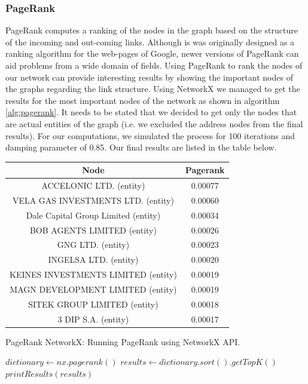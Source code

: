 \documentclass[sigconf, nonacm]{acmart}
\begin{document}
\subsubsection{PageRank}
PageRank computes a ranking of the nodes in the graph based on the structure of the incoming and out-coming links. Although is was originally designed as a ranking algorithm for the web-pages of Google, newer versions of PageRank can aid problems from a wide domain of fields. Using PageRank to rank the nodes of our network can provide interesting results by showing the important nodes of the graphs regarding the link structure. Using NetworkX we managed to get the results for the most important nodes of the network as shown in algorithm \ref{alg:pagerank}. It needs to be stated that we decided to get only the nodes that are actual entities of the graph (i.e. we excluded the address nodes from the final results). For our computations, we simulated the process for 100 iterations and damping parameter of 0.85. Our final results are listed in the table below.
\begin{center}
\begin{tabular}{||c | c ||} %
 \hline
 Node & Pagerank \\ [0.5ex] 
 \hline\hline
 ACCELONIC LTD. (entity) & 0.00077 \\ 
 \hline
VELA GAS INVESTMENTS LTD. (entity) & 0.00060 \\
 \hline
Dale Capital Group Limited (entity) & 0.00034 \\
 \hline
BOB AGENTS LIMITED (entity) & 0.00026 \\
 \hline
GNG LTD. (entity) & 0.00023 \\
 \hline
INGELSA LTD. (entity) & 0.00020 \\
 \hline
KEINES INVESTMENTS LIMITED (entity) & 0.00019 \\
 \hline
MAGN DEVELOPMENT LIMITED (entity) & 0.00019 \\
 \hline
SITEK GROUP LIMITED (entity) & 0.00018 \\
 \hline
3 DIP S.A. (entity) & 0.00017 \\
 \hline
\end{tabular}
\end{center}
\begin{algorithm}
\caption{PageRank NetworkX: Running PageRank using NetworkX API.}\label{alg:pagerank}
\begin{algorithmic}

\State $dictionary \gets nx.pagerank()$
\State $results \gets dictionary.sort().getTopK()$
\State $printResults(results)$

\end{algorithmic}
\end{algorithm}
\end{document}
